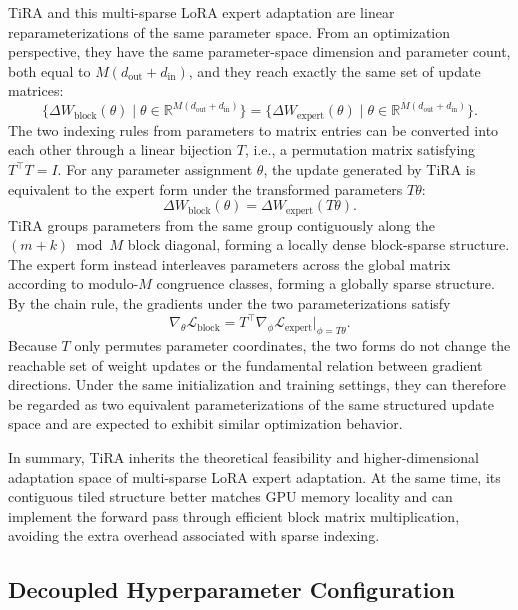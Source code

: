 \documentclass[a4paper,11pt]{article}
\newcommand{\R}{\mathbb{R}}
\begin{document}
TiRA and this multi-sparse LoRA expert adaptation are linear reparameterizations of the same parameter space. From an optimization perspective, they have the same parameter-space dimension and parameter count, both equal to $M(d_{\mathrm{out}}+d_{\mathrm{in}})$, and they reach exactly the same set of update matrices:
\begin{equation}
    \{\Delta W_{\mathrm{block}}(\theta)\mid \theta\in\R^{M(d_{\mathrm{out}}+d_{\mathrm{in}})}\}
    =
    \{\Delta W_{\mathrm{expert}}(\theta)\mid \theta\in\R^{M(d_{\mathrm{out}}+d_{\mathrm{in}})}\}.
\end{equation}
The two indexing rules from parameters to matrix entries can be converted into each other through a linear bijection $T$, i.e., a permutation matrix satisfying $T^{\top}T=I$. For any parameter assignment $\theta$, the update generated by TiRA is equivalent to the expert form under the transformed parameters $T\theta$:
\begin{equation}
    \Delta W_{\mathrm{block}}(\theta)=\Delta W_{\mathrm{expert}}(T\theta).
\end{equation}
TiRA groups parameters from the same group contiguously along the $(m+k)\bmod M$ block diagonal, forming a locally dense block-sparse structure. The expert form instead interleaves parameters across the global matrix according to modulo-$M$ congruence classes, forming a globally sparse structure. By the chain rule, the gradients under the two parameterizations satisfy
\begin{equation}
    \nabla_{\theta}\mathcal{L}_{\mathrm{block}}
    =T^{\top}\nabla_{\phi}\mathcal{L}_{\mathrm{expert}}\big|_{\phi=T\theta}.
\end{equation}
Because $T$ only permutes parameter coordinates, the two forms do not change the reachable set of weight updates or the fundamental relation between gradient directions. Under the same initialization and training settings, they can therefore be regarded as two equivalent parameterizations of the same structured update space and are expected to exhibit similar optimization behavior.

In summary, TiRA inherits the theoretical feasibility and higher-dimensional adaptation space of multi-sparse LoRA expert adaptation. At the same time, its contiguous tiled structure better matches GPU memory locality and can implement the forward pass through efficient block matrix multiplication, avoiding the extra overhead associated with sparse indexing.

\subsection{Decoupled Hyperparameter Configuration}
\end{document}
